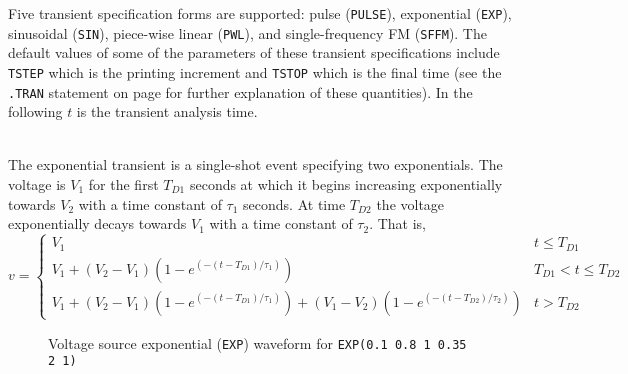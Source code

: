 
Five transient specification forms are supported:
pulse ({\tt PULSE}),  exponential ({\tt EXP}),  sinusoidal ({\tt SIN}),
piece-wise  linear ({\tt PWL}),   and
single-frequency FM ({\tt SFFM}).  The default values of some of the parameters
of these transient specifications include
{\tt TSTEP} which is the printing increment and {\tt TSTOP} which is the
final time (see the {\tt .TRAN} statement on page \pageref{.TRANstatement}
for further explanation of these quantities).
In the following $t$ is the transient analysis time.

\\[0.2in]
\vspace{-0.5in}
The exponential transient is a single-shot event specifying two exponentials.
The voltage is
$V_1$ for the first $T_{D1}$ seconds at which it begins increasing exponentially
towards $V_2$ with a time constant of $\tau_1$ seconds.  At time
$T_{D2}$ the voltage exponentially decays towards $V_1$ with a time constant
of $\tau_2$. That is,
\begin{equation}
v = \left\{ \begin{array}{ll}
     V_1                                           & t \le T_{D1}\\
     V_1+(V_2-V_1)(1-e^{\textstyle (-(t-T_{D1})/\tau_1)})  & T_{D1} < t \le T_{D2}\\
     V_1+(V_2-V_1)(1-e^{\textstyle (-(t-T_{D1})/\tau_1)})
        +(V_1-V_2)(1-e^{\textstyle (-(t-T_{D2})/\tau_2)})  &  t > T_{D2}
     \end{array} \right. %
\end{equation}
\vspace*{-0.2in}
\begin{figure}[hbp]
\centering

\caption[Voltage source exponential ({\tt EXP}) waveform]{Voltage source exponential
({\tt EXP}) waveform for {\tt EXP(0.1 0.8 1 0.35 2 1)} \label{fig:vexp} }
\end{figure}

